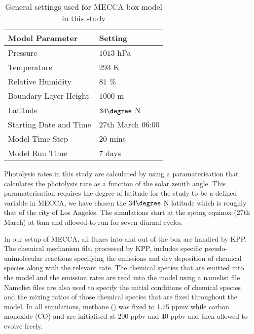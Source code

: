 \begin{table}
    \begin{center}
        \caption{General settings used for MECCA box model in this study}
        \begin{tabular}{ll}
            \hline \hline
            \textbf{Model Parameter} & \textbf{Setting} \\
            \hline \hline
            Pressure & $1013$ hPa \\
            Temperature & $293$ K \\
            Relative Humidity & $81$ \% \\
            Boundary Layer Height & $1000$ m \\
            Latitude & $34\degree$ N \\
            Starting Date and Time & 27th March 06:00 \\
            Model Time Step & $20$ mins \\
            Model Run Time & $7$ days \\
            \hline \hline
        \end{tabular}
        \label{t:model_setup}
    \end{center}
\end{table}

Photolysis rates in this study are calculated by using a paramaterisation that calculates the photolysis rate as a function of the solar zenith angle.
This paramaterisation requires the degree of latitude for the study to be a defined variable in MECCA, we have chosen the $34\degree$ N latitude which is roughly that of the city of Los Angeles.
The simulations start at the spring equinox (27th March) at 6am and allowed to run for seven diurnal cycles.

In our setup of MECCA, all fluxes into and out of the box are handled by KPP.
The chemical mechanism file, processed by KPP, includes specific pseudo-unimolecular reactions specifying the emissions and dry deposition of chemical species along with the relevant rate.
The chemical species that are emitted into the model and the emission rates are read into the model using a namelist file.
Namelist files are also used to specify the initial conditions of chemical species and the mixing ratios of those chemical species that are fixed throughout the model.
In all simulations, methane () was fixed to 1.75 ppmv while carbon monoxide (CO) and  are initialised at 200 ppbv and 40 ppbv and then allowed to evolve freely.

